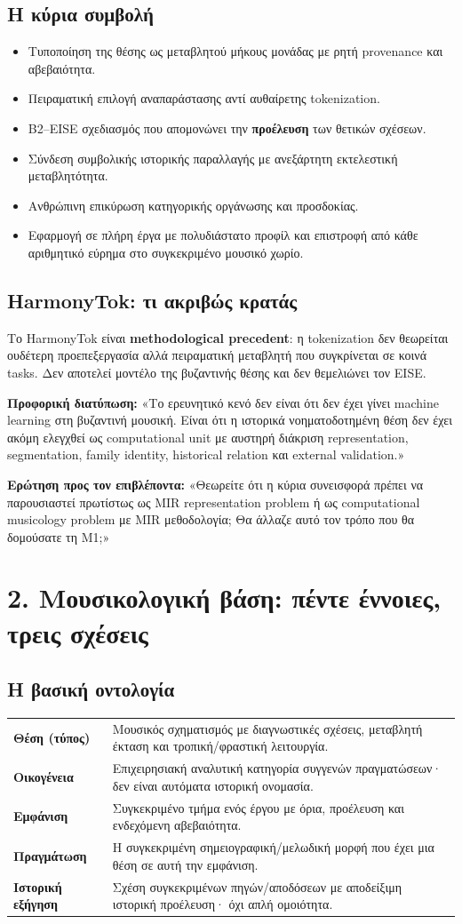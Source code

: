\documentclass[9pt,a4paper]{extarticle}
\newcommand{\say}[1]{\begin{keybox}\textbf{Προφορική διατύπωση:} #1\end{keybox}}
\newcommand{\ask}[1]{\begin{warnbox}\textbf{Ερώτηση προς τον επιβλέποντα:} #1\end{warnbox}}
\begin{document}
\subsection*{Η κύρια συμβολή}
\begin{itemize}
\item Τυποποίηση της θέσης ως μεταβλητού μήκους μονάδας με ρητή provenance και αβεβαιότητα.
\item Πειραματική επιλογή αναπαράστασης αντί αυθαίρετης tokenization.
\item B2--EISE σχεδιασμός που απομονώνει την \textbf{προέλευση} των θετικών σχέσεων.
\item Σύνδεση συμβολικής ιστορικής παραλλαγής με ανεξάρτητη εκτελεστική μεταβλητότητα.
\item Ανθρώπινη επικύρωση κατηγορικής οργάνωσης και προσδοκίας.
\item Εφαρμογή σε πλήρη έργα με πολυδιάστατο προφίλ και επιστροφή από κάθε αριθμητικό εύρημα στο συγκεκριμένο μουσικό χωρίο.
\end{itemize}

\subsection*{HarmonyTok: τι ακριβώς κρατάς}
Το HarmonyTok είναι \textbf{methodological precedent}: η tokenization δεν θεωρείται ουδέτερη προεπεξεργασία αλλά πειραματική μεταβλητή που συγκρίνεται σε κοινά tasks. Δεν αποτελεί μοντέλο της βυζαντινής θέσης και δεν θεμελιώνει τον EISE.

\say{«Το ερευνητικό κενό δεν είναι ότι δεν έχει γίνει machine learning στη βυζαντινή μουσική. Είναι ότι η ιστορικά νοηματοδοτημένη θέση δεν έχει ακόμη ελεγχθεί ως computational unit με αυστηρή διάκριση representation, segmentation, family identity, historical relation και external validation.»}

\ask{«Θεωρείτε ότι η κύρια συνεισφορά πρέπει να παρουσιαστεί πρωτίστως ως MIR representation problem ή ως computational musicology problem με MIR μεθοδολογία; Θα άλλαζε αυτό τον τρόπο που θα δομούσατε τη M1;»}

\newpage
\section*{2. Μουσικολογική βάση: πέντε έννοιες, τρεις σχέσεις}
\subsection*{Η βασική οντολογία}
\begin{tabularx}{\linewidth}{>{\bfseries}p{3cm}X}
Θέση (τύπος) & Μουσικός σχηματισμός με διαγνωστικές σχέσεις, μεταβλητή έκταση και τροπική/φραστική λειτουργία.\tabularnewline
Οικογένεια & Επιχειρησιακή αναλυτική κατηγορία συγγενών πραγματώσεων· δεν είναι αυτόματα ιστορική ονομασία.\tabularnewline
Εμφάνιση & Συγκεκριμένο τμήμα ενός έργου με όρια, προέλευση και ενδεχόμενη αβεβαιότητα.\tabularnewline
Πραγμάτωση & Η συγκεκριμένη σημειογραφική/μελωδική μορφή που έχει μια θέση σε αυτή την εμφάνιση.\tabularnewline
Ιστορική εξήγηση & Σχέση συγκεκριμένων πηγών/αποδόσεων με αποδείξιμη ιστορική προέλευση· όχι απλή ομοιότητα.\tabularnewline
\end{tabularx}
\end{document}
